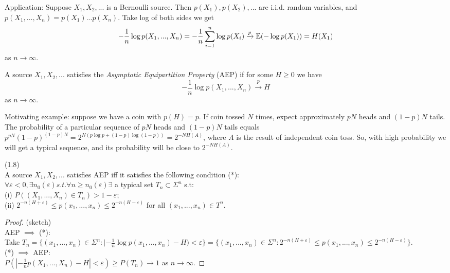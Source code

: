 \documentclass[a4paper]{article}
\begin{document}
Application: Suppose $X_1,X_2,...$ is a Bernoulli source. Then $p(X_1),p(X_2),...$ are i.i.d. random variables, and $p(X_1,...,X_n) = p(X_1)...p(X_n)$. Take log of both sides we get 
$$-\frac{1}{n} \log p(X_1,...,X_n) = -\frac{1}{n} \sum_{i=1}^n \log p(X_i) \xrightarrow{p} \mathbb{E}(-\log p(X_1)) = H(X_1)$$
as $n \to \infty$.

\begin{defi}
A source $X_1,X_2,...$ satisfies the \emph{Asymptotic Equipartition Property} (AEP) if for some $H \geq 0$ we have
$$ -\frac{1}{n} \log p(X_1,...,X_n) \xrightarrow{p} H$$
as $n \to \infty$.
\end{defi}

Motivating example: suppose we have a coin with $p(H) = p$. If coin tossed $N$ times, expect approximately $pN$ heads and $(1-p)N$ tails. The probability of a particular sequence of $pN$ heads and $(1-p)N$ tails equals $p^{pN} (1-p)^{(1-p)N} = 2^{N(p\log p + (1-p) \log (1-p))} = 2^{-NH(A)}$, where $A$ is the result of independent coin toss. So, with high probability we will get a typical sequence, and its probability will be close to $2^{-NH(A)}$.

\begin{lemma} (1.8)\\
A source $X_1,X_2,...$ satisfies AEP iff it satisfies the following condition (*):\\
$\forall \varepsilon < 0, \exists n_0(\varepsilon) s.t. \forall n \geq n_0(\varepsilon) \exists$ a typical set $T_n \subset \Sigma^n$ s.t:\\
(i) $P((X_1,...,X_n) \in T_n) > 1-\varepsilon$;\\
(ii) $2^{-n(H+\varepsilon)} \leq p(x_1,...,x_n) \leq 2^{-n(H-\varepsilon)}$ for all $(x_1,...,x_n) \in T^n$.
\begin{proof} (sketch)\\
AEP $\implies$ (*):\\
Take $T_n = \{(x_1,...,x_n) \in \Sigma^n: |-\frac{1}{n} \log p(x_1,...,x_n) - H) < \varepsilon \} = \{(x_1,...,x_n) \in \Sigma^n : 2^{-n(H+\varepsilon)} \leq p(x_1,...,x_n) \leq 2^{-n(H-\varepsilon)}\}$.\\
(*) $\implies$ AEP:\\
$P(|-\frac{1}{n} p(X_1,...,X_n) - H| < \varepsilon) \geq P(T_n) \to 1$ as $n \to \infty$.
\end{proof}
\end{lemma}
\end{document}
